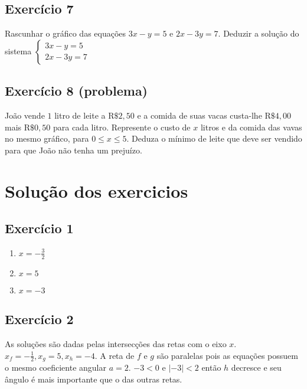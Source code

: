 \subsection*{Exercício 7}

Rascunhar o gráfico das equações $3x-y=5$ e $2x-3y=7$. Deduzir a solução do
sistema $\left\{\begin{aligned}
   3x-y=5 \\
  2x-3y=7
\end{aligned}\right.$

\subsection*{Exercício 8 (problema)}

João vende $1$ litro de leite a $\text{R\$}2,50$ e a comida de suas vacas custa-lhe
$\text{R\$}4,00$ mais $\text{R\$}0,50$ para cada litro.
Represente o custo de $x$ litros e da comida das vavas
no mesmo gráfico, para $0 \leq x \leq 5$. Deduza o mínimo de leite que deve ser
vendido para que João não tenha um prejuízo.

\section{Solução dos exercicios}

\subsection*{Exercício 1}

\begin{enumerate}
\item $x = -\frac{3}{2}$
\item $x = 5$
\item $x = -3$
\end{enumerate}

\subsection*{Exercício 2}

As soluções são dadas pelas intersecções das retas com o eixo $x$.
$x_f = -\frac{1}{2}, x_g = 5, x_h = -4$. A reta de $f$ e $g$ são paralelas
pois as equações possuem o mesmo coeficiente angular $a = 2$. $-3 < 0$ e ${|-3|} < 2$
então $h$ decresce e seu ângulo é mais importante que o das outras retas.

\begin{center}
\end{center}

